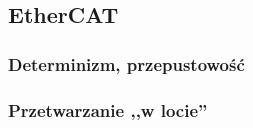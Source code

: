 \subsection{EtherCAT}


\subsubsection{Determinizm, przepustowość}

\subsubsection{Przetwarzanie ,,w locie''}

%


